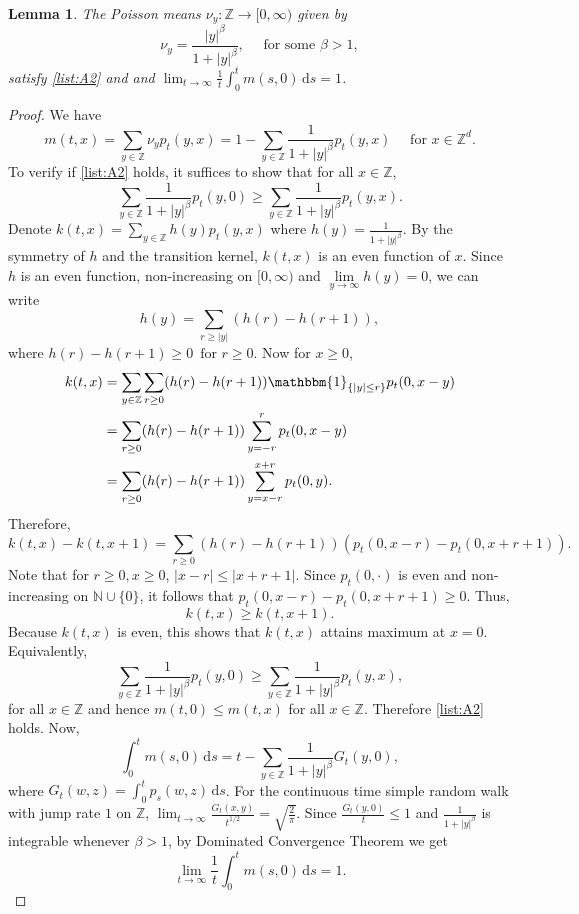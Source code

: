 \documentclass{article}[12pt]
\newtheorem{lemma}{Lemma}[section]
\theoremstyle{definition}
\newcommand{\N}{\mathbb{N}}
\newcommand{\Z}{\mathbb{Z}}
\newcommand{\1}{\mathbbm{1}}
\newcommand{\dd }{\mathrm{d} }
\begin{document}
   \begin{lemma}
  The Poisson means $\nu_y:\Z \to [0,\infty)$ given by
   $$\nu_y = \frac{|y|^\beta}{1+|y|^\beta},\quad \text{ for some }\beta>1,$$
 satisfy \ref{list:A2} and and $\lim_{t\to\infty}\frac{1}{t}\int_0^t m(s,0)\,\dd s = 1$.
  \label{clm:polycase}
  \end{lemma}
\begin{proof}
 We have
    $$m(t,x) = \sum_{y\in \Z}\nu_y p_t(y,x) = 1- \sum_{y\in \Z}\frac{1}{1+|y|^\beta}p_t(y,x)\quad\text{ for } x\in \Z^d.$$
    To verify if \ref{list:A2} holds, it suffices to show that for all $x\in \Z$,
    $$\sum_{y\in \Z}\frac{1}{1+|y|^\beta}p_t(y,0) \ge \sum_{y\in \Z}\frac{1}{1+|y|^\beta}p_t(y,x).$$
    Denote $k(t,x) = \sum_{y\in \Z}h(y)p_t(y,x)$ where $h(y) = \frac{1}{1+|y|^\beta}$. By the symmetry of $h$ and the transition kernel, $k(t,x)$ is an even function of $x$. Since $h$ is an even function, non-increasing on $[0,\infty)$ and $\lim\limits_{y\to \infty}h(y) = 0$, we can write 
    $$h(y) = \sum_{r\ge \lvert y\rvert}(h(r) - h(r+1)),$$ where $h(r) - h(r+1) \ge 0 \, \text{ for } r\ge 0$.
    Now for $x\ge 0$, 
    \begin{align*}
        k(t,x) &= \sum_{y\in \Z}\sum_{r\ge 0}(h(r)-h(r+1))\1_{\{\lvert y \rvert\le r\}}p_t(0, x-y)\\
        &= \sum_{r\ge 0}(h(r)-h(r+1))\sum_{y = -r}^r p_t(0, x-y)\\
        &= \sum_{r\ge 0}(h(r)-h(r+1))\sum_{y = x-r}^{x+ r} p_t(0, y).
    \end{align*}
    Therefore,
    $$k(t,x) - k(t,x+1) = \sum_{r\ge 0}(h(r)-h(r+1))(p_t(0, x-r) - p_t(0,x+r+1)).$$
    Note that for $r\ge 0, x\ge 0$, $\lvert x-r\rvert\le |x+r+1|$. Since $p_t(0, \cdot)$ is even and non-increasing on $\N\cup \{0\}$, it follows that $p_t(0, x-r) - p_t(0,x+r+1)\ge 0$. Thus, 
    $$k(t,x) \ge k(t,x+1).$$ Because $k(t,x)$ is even, this shows that $k(t,x)$ attains maximum at $x=0$. Equivalently,
    $$\sum_{y\in \Z}\frac{1}{1+|y|^\beta}p_t(y,0) \ge \sum_{y\in \Z}\frac{1}{1+|y|^\beta}p_t(y,x),$$ for all $x\in \Z$ and hence $m(t,0)\le m(t,x)$ for all $x\in \Z$. Therefore \ref{list:A2} holds. Now,
    $$\int_0^t m(s,0)\, \dd s = t - \sum_{y\in \Z}\frac{1}{1+|y|^\beta}G_t(y,0),$$
    where $G_t(w,z) = \int_0^t p_s(w,z)\,\dd s$. For the continuous time simple random walk with jump rate $1$ on $\Z$, $\lim_{t\to \infty}\frac{G_t(x,y)}{t^{1/2}} = \sqrt{\frac{2}{\pi}}$. Since $\frac{G_t(y,0)}{t}\le 1$ and $\frac{1}{1+|y|^\beta}$ is integrable whenever $\beta>1$, by Dominated Convergence Theorem we get
    $$\lim_{t\to\infty}\frac{1}{t}\int_0^t m(s,0)\, \dd s = 1.$$
\end{proof}
\end{document}
